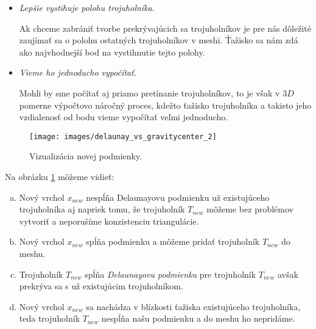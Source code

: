 \begin{enumerate}
{\begin{itemize}
{                Hlavný problém, prečo overovanie Delaunayovej podmienky pre všetky trojuholníky spôsobuje
                odmietanie aj vhodných trojuholníkov je ten, že stred opísanej kružnice nemusí byť vždy
                vnútri trojuholníka. Čím je trojuholník užší, tým je dokonca vzdialenejší a tak môže aj
                vzdialenejší úzky trojuholník spôsobiť nevzniknutie vhodného trojuholníka. 
            }
            \item{
                \textit{Lepšie vystihuje polohu trojuholníka.}

                Ak chceme zabrániť tvorbe prekrývajúcich sa trojuholníkov je pre nás dôležité zaujímať sa 
                o polohu ostatných trojuholníkov v meshi. Ťažisko sa nám zdá ako najvhodnejší bod na 
                vystihnutie tejto polohy.
            }
            \item{
                \textit{Vieme ho jednoducho vypočítať.}

                Mohli by sme počítať aj priamo pretínanie trojuholníkov, to je však v $3D$ pomerne 
                výpočtovo náročný proces, kdežto ťažisko trojuholníka a takisto jeho vzdialenosť od 
                bodu vieme vypočítať veľmi jednoducho.
            }
         \end{itemize}
         
         \begin{figure}
         \centerline{\texttt{[image: images/delaunay\_vs\_gravitycenter\_2]}}
         \caption[Nová podmienka pre blízkosť ťažiska k novému vrcholu]{Vizualizácia novej podmienky.}
         \label{obr:delaunay_vs_gravitycenter_2}
         \end{figure}
         
         Na obrázku \ref{obr:delaunay_vs_gravitycenter_2} môžeme vidieť:
         \begin{enumerate}[a)]
            \item{
                Nový vrchol $x_{new}$ nespĺňa Delaunayovu podmienku už existujúceho trojuholníka aj 
                napriek tomu, že trojuholník $T_{new}$ môžeme bez problémov vytvoriť a 
                neporušíme konzistenciu triangulácie.
            }
            \item{
                Nový vrchol $x_{new}$ spĺňa podmienku a môžeme pridať trojuholník $T_{new}$ do meshu.
            }
            \item{
                Trojuholník $T_{new}$ spĺňa \textit{Delaunayovu podmienku} pre trojuholník $T_{new}$ 
                avšak prekrýva sa s už existujúcim trojuholníkom.
            }
            \item{
                Nový vrchol $x_{new}$ sa nachádza v blízkosti ťažiska existujúceho trojuholníka, 
                teda trojuholník $T_{new}$ nespĺňa našu podmienku a do meshu ho nepridáme. 
            }
         \end{enumerate}


}
\end{enumerate}
